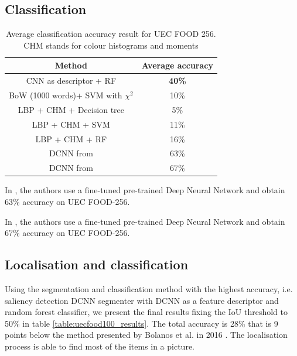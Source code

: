 \subsection{Classification}

\begin{table}
    \centering
    \renewcommand{\arraystretch}{1.2}
    \begin{tabulary}{\textwidth}{| c | C|}
        \hline
        Method & Average accuracy \\
        \hline
        CNN as descriptor + RF & \textbf{40\%} \\ 
        \hline
        BoW (1000 words)+ SVM with $\chi^2$ & 10\% \\ %
        \hline
        LBP + CHM + Decision tree & 5\% \\ 
        \hline
        LBP + CHM + SVM & 11\% \\ %
        \hline
        LBP + CHM + RF & 16\% \\ %
        \hline
        DCNN from \cite{Bolanos2016} & 63\%\\
        \hline 
        DCNN from \cite{Yanai2015} & 67\%\\
        \hline 
    \end{tabulary}
    \caption[Average classification accuracy result for UEC FOOD 256]{Average classification accuracy result for UEC FOOD 256. CHM stands for colour histograms and moments}
\end{table}

In \cite{Bolanos2016}, the authors use a fine-tuned pre-trained Deep Neural Network and obtain 63\% accuracy on UEC FOOD-256.

In \cite{Yanai2015}, the authors use a fine-tuned pre-trained Deep Neural Network and obtain 67\% accuracy on UEC FOOD-256.


\subsection{Localisation and classification}

Using the segmentation and classification method with the highest accuracy, i.e. saliency detection DCNN segmenter with DCNN as a feature descriptor and random forest classifier, we present the final results fixing the IoU threshold to 50\% in table \ref{table:uecfood100_results}. The total accuracy is 28\% that is 9 points below the method presented by Bolanos et al. in 2016 \cite{Bolanos2016}. The localisation process is able to find most of the items in a picture.

